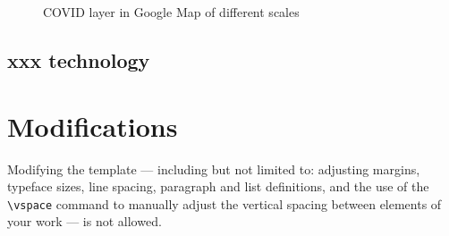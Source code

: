\documentclass[sigplan,screen]{acmart}
\begin{document}
\begin{figure}[htb]
	\centering
	\caption{COVID layer in Google Map of different scales}
	\Description{}
\end{figure}

\subsection{xxx technology}

\section{Modifications}
Modifying the template --- including but not limited to: adjusting
margins, typeface sizes, line spacing, paragraph and list definitions,
and the use of the \verb|\vspace| command to manually adjust the
vertical spacing between elements of your work --- is not allowed.
\end{document}
